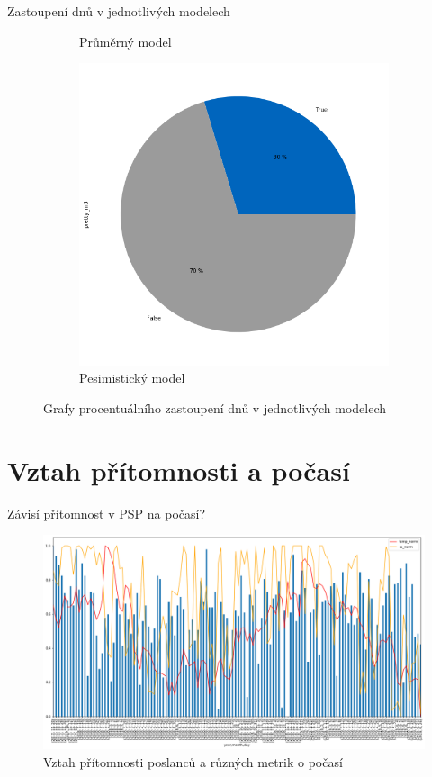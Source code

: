 \documentclass[10pt]{beamer}
\begin{document}
\begin{frame}{Zastoupení  dnů v jednotlivých modelech}
\begin{figure}
\begin{subfigure}{.33\textwidth}
  \caption{Průměrný model}
  \label{fig:sfig2}
\end{subfigure}
\begin{subfigure}{.33\textwidth}
  \centering
  \includegraphics[width=\linewidth]{m3_pie.png}
  \caption{Pesimistický model}
  \label{fig:sfig2}
\end{subfigure}
\caption{Grafy procentuálního zastoupení  dnů v jednotlivých modelech}
\label{fig:fig}
\end{figure}
\end{frame}

\section{Vztah přítomnosti a počasí}

\begin{frame}{Závisí přítomnost v PSP na počasí?}
    \begin{figure}
        \centering
        \includegraphics[width=\textwidth]{weather_att.png}
        \caption{Vztah přítomnosti poslanců a různých metrik o počasí}
        \label{fig:my_label}
    \end{figure}
\end{frame}
\end{document}

